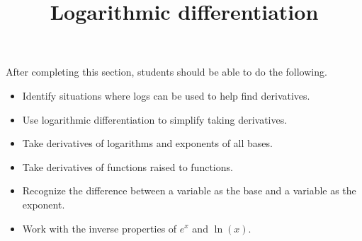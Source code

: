 \documentclass{ximera}
\title{Logarithmic differentiation}
\begin{document}
\begin{abstract}
\end{abstract}

\maketitle

\begin{sectionOutcomes}

After completing this section, students should be able to do the following.

\begin{itemize}
	\item Identify situations where logs can be used to help find derivatives.
	\item Use logarithmic differentiation to simplify taking derivatives.
	\item Take derivatives of logarithms and exponents of all bases.
	\item Take derivatives of functions raised to functions.
	\item Recognize the difference between a variable as the base and a variable as the exponent.
	\item Work with the inverse properties of $e^x$ and $\ln(x)$.
\end{itemize}

\end{sectionOutcomes}
\end{document}
